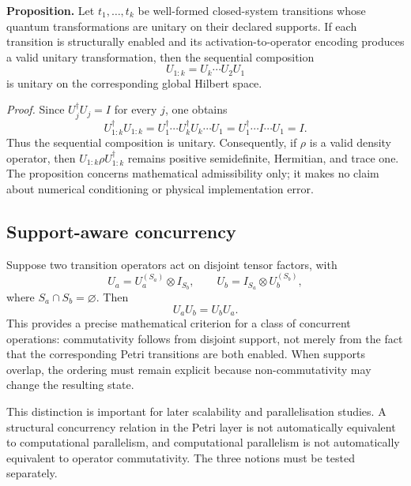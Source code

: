 \documentclass[final,3p,times]{elsarticle}
\begin{document}
\textbf{Proposition.} Let $t_1,\ldots,t_k$ be well-formed closed-system transitions whose quantum transformations are unitary on their declared supports. If each transition is structurally enabled and its activation-to-operator encoding produces a valid unitary transformation, then the sequential composition
\begin{equation}
    U_{1:k}=U_k\cdots U_2U_1
\end{equation}
is unitary on the corresponding global Hilbert space.

\textit{Proof.} Since $U_j^\dagger U_j=I$ for every $j$, one obtains
\begin{equation}
    U_{1:k}^\dagger U_{1:k}
    =U_1^\dagger\cdots U_k^\dagger U_k\cdots U_1
    =U_1^\dagger\cdots I\cdots U_1
    =I.
\end{equation}
Thus the sequential composition is unitary. Consequently, if $\rho$ is a valid density operator, then $U_{1:k}\rho U_{1:k}^\dagger$ remains positive semidefinite, Hermitian, and trace one. The proposition concerns mathematical admissibility only; it makes no claim about numerical conditioning or physical implementation error.

\subsection{Support-aware concurrency}

Suppose two transition operators act on disjoint tensor factors, with
\begin{equation}
    U_a=U_a^{(S_a)}\otimes I_{S_b},
    \qquad
    U_b=I_{S_a}\otimes U_b^{(S_b)},
\end{equation}
where $S_a\cap S_b=\varnothing$. Then
\begin{equation}
    U_aU_b=U_bU_a.
\end{equation}
This provides a precise mathematical criterion for a class of concurrent operations: commutativity follows from disjoint support, not merely from the fact that the corresponding Petri transitions are both enabled. When supports overlap, the ordering must remain explicit because non-commutativity may change the resulting state.

This distinction is important for later scalability and parallelisation studies. A structural concurrency relation in the Petri layer is not automatically equivalent to computational parallelism, and computational parallelism is not automatically equivalent to operator commutativity. The three notions must be tested separately.
\end{document}
